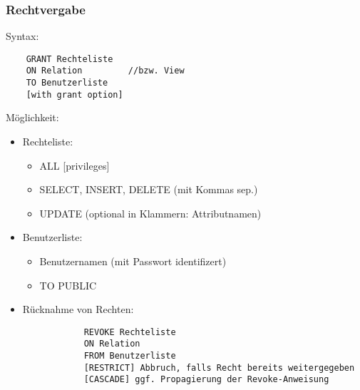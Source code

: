 \subsubsection{Rechtvergabe}
Syntax:\begin{verbatim}
    GRANT Rechteliste
    ON Relation         //bzw. View
    TO Benutzerliste
    [with grant option]
\end{verbatim}
\begin{remark}
    M\"oglichkeit:\begin{itemize}
        \item Rechteliste: \begin{itemize}
            \item ALL [privileges]
            \item SELECT, INSERT, DELETE (mit Kommas sep.)
            \item UPDATE (optional in Klammern: Attributnamen)
        \end{itemize}
        \item Benutzerliste:\begin{itemize}
            \item Benutzernamen (mit Passwort identifizert)
            \item TO PUBLIC
        \end{itemize}
        \item R\"ucknahme von Rechten:
        \begin{verbatim}
            REVOKE Rechteliste
            ON Relation
            FROM Benutzerliste
            [RESTRICT] Abbruch, falls Recht bereits weitergegeben
            [CASCADE] ggf. Propagierung der Revoke-Anweisung
        \end{verbatim}
    \end{itemize}
\end{remark}
